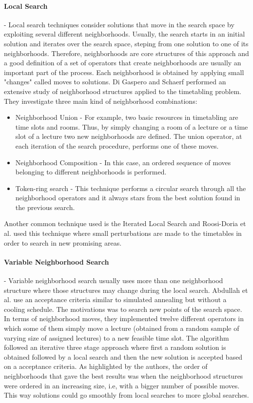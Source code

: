 \paragraph{\textbf{Local Search}} - Local search techniques consider solutions that move in the search space by exploiting several different neighborhoods. Usually, the search starts in an initial solution and iterates over the search space, steping from one solution to one of its neighborhoods. Therefore, neighborhoods are core structures of this approach and a good definition of a set of operators that create neighborhoods are usually an important part of the process. Each neighborhood is obtained by applying small "changes" called moves to solutions. Di Gaspero and Schaerf \citep{di2003multi} performed an extensive study of neighborhood structures applied to the timetabling problem. They investigate three main kind of neighborhood combinations:
	\begin{itemize}
		\item Neighborhood Union - For example, two basic resources in timetabling are time slots and rooms. Thus, by simply changing a room of a lecture or a time slot of a lecture two new neighborhoods are defined. The union operator, at each iteration of the search procedure, performs one of these moves.
		\item Neighborhood Composition - In this case, an ordered sequence of moves belonging to different neighborhoods is performed.
		\item Token-ring search - This technique performs a circular search through all the neighborhood operators and it always stars from the best solution found in the previous search.
	\end{itemize}
	Another common technique used is the Iterated Local Search and Roosi-Doria et al. \citep{rossi2003comparison} used this technique where small perturbations are made to the timetables in order to search in new promising areas. 

\paragraph{\textbf{Variable Neighborhood Search}} - Variable neighborhood search usually uses more than one neighborhood structure where those structures may change during the local search. Abdullah et al. \citep{abdullah2005investigation} use an acceptance criteria similar to simulated annealing but without a cooling schedule. The motivations was to search new points of the search space. In terms of neighborhood moves, they implemented twelve different operators in which some of them simply move a lecture (obtained from a random sample of varying size of assigned lectures) to a new feasible time slot. The algorithm followed an iterative three stage approach where first a random solution is obtained followed by a local search and then the new solution is accepted based on a acceptance criteria. As highlighted by the authors, the order of neighborhoods that gave the best results was when the neighborhood structures were ordered in an increasing size, i.e, with a bigger number of possible moves. This way solutions could go smoothly from local searches to more global searches.
  

